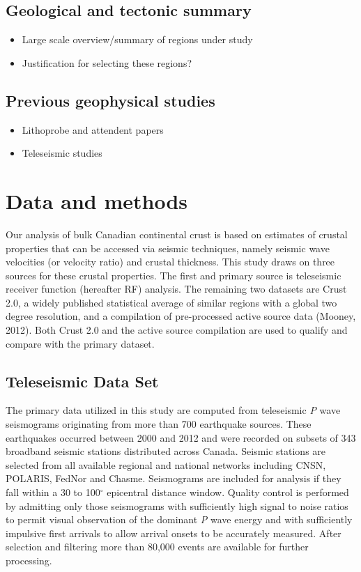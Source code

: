 \documentclass[draft, 12pt]{article}
\begin{document}
\subsection{Geological and tectonic summary}
\begin{itemize}

\item Large scale overview/summary of regions under study
\item Justification for selecting these regions?

\end{itemize}

\subsection{Previous geophysical studies}
\begin{itemize}

\item Lithoprobe and attendent papers
\item Teleseismic studies

\end{itemize}
\section{Data and methods}
Our analysis of bulk Canadian continental crust is based on estimates of crustal properties that can be accessed via seismic techniques, namely seismic wave velocities (or velocity ratio) and crustal thickness. This study draws on three sources for these crustal properties. The first and primary source is teleseismic receiver function (hereafter RF) analysis. The remaining two datasets are Crust 2.0, a widely published statistical average of similar regions with a global two degree resolution, and a compilation of pre-processed active source data (Mooney, 2012). Both Crust 2.0 and the active source compilation are used to qualify and compare with the primary dataset.

\subsection{Teleseismic Data Set}
The primary data utilized in this study are computed from teleseismic {\it P} wave seismograms originating from more than 700 earthquake sources. These earthquakes occurred between 2000 and 2012 and were recorded on subsets of 343 broadband seismic stations distributed across Canada. Seismic stations are selected from all available regional and national networks including CNSN, POLARIS, FedNor and Chasme. Seismograms are included for analysis if they fall within a 30 to 100$^\circ$ epicentral distance window. Quality control is performed by admitting only those seismograms with sufficiently high signal to noise ratios to permit visual observation of the dominant {\it P} wave energy and with sufficiently impulsive first arrivals to allow arrival onsets to be accurately measured. After selection and filtering more than 80,000 events are available for further processing.
\end{document}
